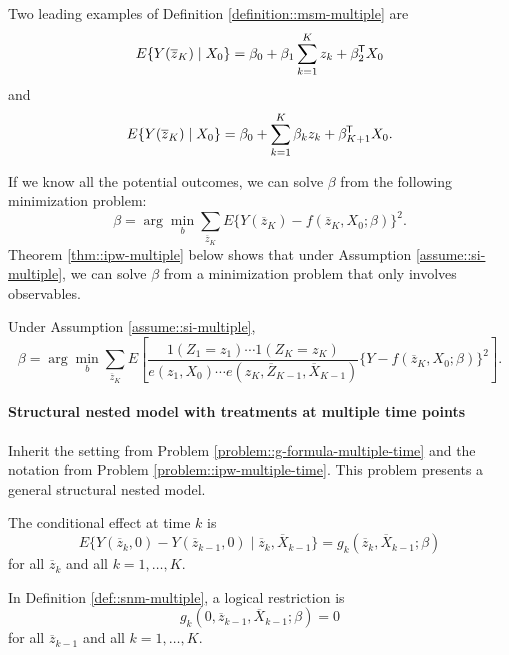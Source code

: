 Two leading examples of Definition \ref{definition::msm-multiple} are 
$$
  E\{ Y(\overline{z}_K)  \mid X_0\}   = \beta_0 + \beta_1 \sum_{k=1}^K z_k + \beta_2^{\mkern-1.5mu\mathsf{T}} X_0 
  $$
and
$$ 
 E\{ Y(\overline{z}_K)  \mid X_0\}   = \beta_0 +  \sum_{k=1}^K \beta_k z_k + \beta_{K+1}^{\mkern-1.5mu\mathsf{T}} X_0 .
 $$

If we know all the potential outcomes, we can solve $\beta$ from the following minimization problem:
$$
\beta = \arg \min_b  \sum_{  \overline{z}_K  }  E\{   Y(\overline{z}_K) -  f(\overline{z}_K, X_0 ; \beta  )\}^2.
$$
Theorem \ref{thm::ipw-multiple} below shows that under Assumption \ref{assume::si-multiple}, we can solve $\beta$ from a minimization problem that only involves observables. 


\begin{theorem}
\label{thm::ipw-multiple}
Under Assumption \ref{assume::si-multiple},
$$
\beta = \arg \min_b  \sum_{  \overline{z}_K  }    E\left[ 
  \frac{1(Z_1 = z_1) \cdots 1( Z_K = z_K) }{    e(z_1, X_0)  \cdots  e(z_K, \overline{Z}_{K-1},  \overline{X}_{K-1})    }
  \{ Y -  f(\overline{z}_K, X_0 ; \beta  )\} ^2
  \right] .
$$
\end{theorem}



  
   \paragraph{Structural nested model with treatments at multiple time points}\label{problem::snm-multiple-time}


Inherit the setting from Problem \ref{problem::g-formula-multiple-time} and the notation from Problem \ref{problem::ipw-multiple-time}. This problem presents a general structural nested model. 

\begin{definition}
\label{def::snm-multiple}
The conditional effect at time $k$ is 
$$
E\{  Y(\overline{z}_k,0) - Y( \overline{z}_{k-1},0) \mid \overline{z}_k , \overline{X}_{k-1} \} = g_k( \overline{z}_k, \overline{X}_{k-1}; \beta) 
$$
for all $\overline{z}_k$ and all $k=1,\ldots, K$. 
\end{definition}


 
In Definition \ref{def::snm-multiple},  a logical restriction is
$$
g_k(0,  \overline{z}_{k-1}, \overline{X}_{k-1}; \beta)    = 0
$$ 
for all $\overline{z}_{k-1}$ and all $k=1,\ldots, K$. 


